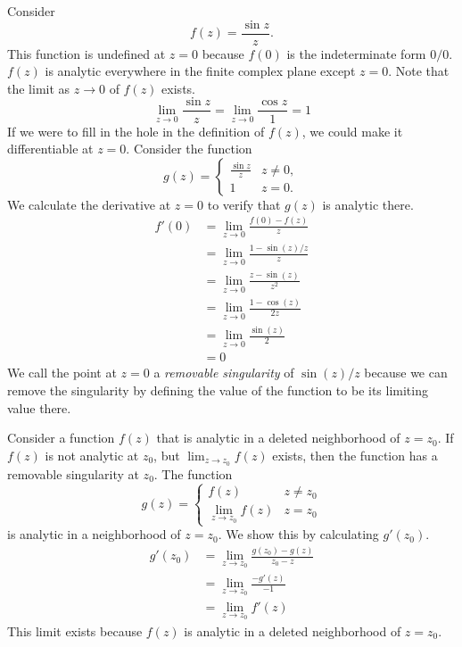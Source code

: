 \begin{Example}
  Consider
  \[
  f(z) = \frac{ \sin z }{ z }.
  \]
  This function is undefined at $z = 0$ because $f(0)$ is the indeterminate
  form $0/0$.  $f(z)$ is analytic everywhere in the finite complex plane
  except $z = 0$.  Note that the limit as $z \to 0$ of $f(z)$
  exists.
  \[
  \lim_{z \to 0} \frac{ \sin z }{ z }
  = \lim_{z \to 0} \frac{ \cos z }{ 1 }
  = 1
  \]
  If we were to fill in the hole in the definition of $f(z)$, we could 
  make it differentiable at $z = 0$.  Consider the function
  \[
  g(z) = \begin{cases}
    \frac{ \sin z }{ z } &z \neq 0, 
    \\
    1 &z = 0.
  \end{cases}
  \]
  We calculate the derivative at $z = 0$ to verify that $g(z)$ is analytic
  there.
  \begin{align*}
    f'(0) &=  \lim_{z \to 0} \frac{ f(0) - f(z) }{ z } 
    \\
    &= \lim_{z \to 0} \frac{ 1 - \sin(z) / z }{ z } 
    \\
    &= \lim_{z \to 0} \frac{ z - \sin(z) }{ z^2 } 
    \\
    &= \lim_{z \to 0} \frac{ 1 - \cos(z) }{ 2 z } 
    \\
    &= \lim_{z \to 0} \frac{ \sin(z) }{ 2 } 
    \\
    &= 0
  \end{align*}
  We call the point at $z = 0$ a \textit{removable singularity} of 
  $\sin(z) / z$ because we can remove the singularity by defining the value
  of the function to be its limiting value there.
\end{Example}




Consider a function $f(z)$ that is analytic in a deleted neighborhood of
$z = z_0$.  If $f(z)$ is not analytic at $z_0$, but
$\lim_{z \to z_0} f(z)$ exists, then the function has a removable
singularity at $z_0$.  The function
\[
g(z) = \begin{cases}
  f(z) &z \neq z_0 
  \\
  \lim_{z \to z_0} f(z) &z = z_0
\end{cases}
\]
is analytic in a neighborhood of $z = z_0$.  We show this by calculating
$g' \left( z_0 \right)$.
\begin{align*}
  g' \left( z_0 \right) 
  &= \lim_{z \to z_0} \frac{g \left( z_0 \right) - g(z)}{z_0 - z} 
  \\
  &= \lim_{z \to z_0} \frac{-g'(z)}{-1} 
  \\
  &= \lim_{z \to z_0} f'(z)
\end{align*}
This limit exists because $f(z)$ is analytic in a deleted neighborhood of 
$z = z_0$.



